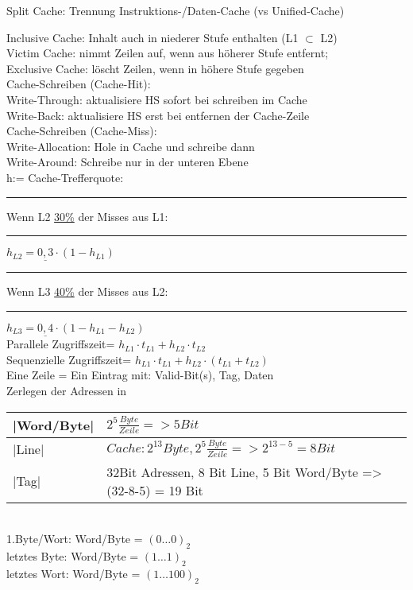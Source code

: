 \newcommand{\tab}{\rule{1cm}{0pt}}
Split Cache: Trennung Instruktions-/Daten-Cache (vs Unified-Cache)

Inclusive Cache: Inhalt auch in niederer Stufe enthalten (L1 $\subset$ L2)\\
Victim Cache: nimmt Zeilen auf, wenn aus höherer Stufe entfernt;\\
Exclusive Cache: löscht Zeilen, wenn in höhere Stufe gegeben\\

Cache-Schreiben (Cache-Hit): \\
Write-Through: aktualisiere HS sofort bei schreiben im Cache\\
Write-Back: aktualisiere HS erst bei entfernen der Cache-Zeile\\

Cache-Schreiben (Cache-Miss):\\
Write-Allocation: Hole in Cache und schreibe dann\\
Write-Around: Schreibe nur in der unteren Ebene \\

h:= Cache-Trefferquote:\\
\tab Wenn L2 \underline{30\%} der Misses aus L1: \tab $h_{L2} = \underline{0,3} \cdot (1 - h_{L1})$\\
\tab Wenn L3 \underline{40\%} der Misses aus L2: \tab $h_{L3} = \underline{0,4} \cdot (1 - h_{L1} - h_{L2})$\\
Parallele Zugriffszeit=  $ h_{L1} \cdot t_{L1} + h_{L2} \cdot t_{L2}$\\
Sequenzielle Zugriffszeit= $h_{L1} \cdot t_{L1} + h_{L2} \cdot (t_{L1}+t_{L2})$\\

Eine Zeile = Ein Eintrag mit: Valid-Bit(s), Tag, Daten\\
Zerlegen der Adressen in 

\begin{tabular}{|l|l|}
\hline
|Word/Byte| &  $ 2^5 \frac{Byte}{Zeile} => 5 Bit$\\
\hline
|Line| & $ Cache: 2^{13} Byte, 2^5 \frac{Byte}{Zeile} => 2^{13-5} = 8 Bit $\\
\hline
|Tag| & 32Bit Adressen, 8 Bit Line, 5 Bit Word/Byte => (32-8-5) = 19 Bit\\
\hline
\end{tabular}\\
1.Byte/Wort: Word/Byte = $(0\dots0)_2$\\
letztes Byte: Word/Byte = $(1\dots1)_2$\\
letztes Wort: Word/Byte = $(1\dots100)_2$

